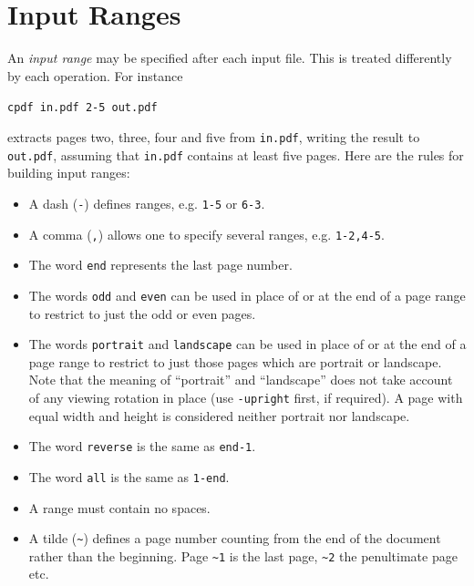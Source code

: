 \documentclass[a4paper,makeidx]{memoir}
\begin{document}
  \section{Input Ranges}
  An   \textit{input range} may be specified
after each input file. This is treated differently by each operation. For
instance
  \begin{framed}
  \small\verb!cpdf in.pdf 2-5 out.pdf!
  \end{framed}
  \noindent extracts pages two, three, four and five from \texttt{in.pdf},
writing the result to \texttt{out.pdf}, assuming that \texttt{in.pdf} contains
at least five pages.
  Here are the rules for building input ranges:
  \begin{itemize}
    \item A dash (\texttt{-}) defines ranges, e.g. \texttt{1-5} or \texttt{6-3}.
    \item A comma (\texttt{,}) allows one to specify several ranges, e.g. \texttt{1-2,4-5}.
    \item The word \texttt{end} represents the last page number.
    \item The words \texttt{odd} and \texttt{even} can be used in place of or at the end of a page range to restrict to just the odd or even pages.
    \item The words \texttt{portrait} and \texttt{landscape} can be used in place of or at the end of a page range to restrict to just those pages which are portrait or landscape. Note that the meaning of ``portrait'' and ``landscape'' does not take account of any viewing rotation in place (use \texttt{-upright} first, if required). A page with equal width and height is considered neither portrait nor landscape.
    \item The word \texttt{reverse} is the same as \texttt{end-1}.
    \item The word \texttt{all} is the same as \texttt{1-end}.
    \item A range must contain no spaces.
    \item A tilde (\texttt{\~{}}) defines a page number counting from the end of the document rather than the beginning. Page \texttt{\~{}1} is the last page, \texttt{\~{}2} the penultimate page etc.
  \end{itemize}
 
\end{document}
